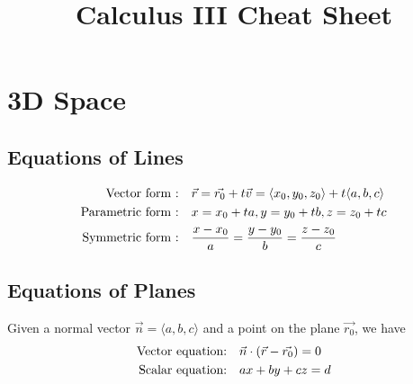 \documentclass[12pt]{article}
\title{Calculus III Cheat Sheet}
\date{}
\author{}
\theoremstyle{definition}
\begin{document}
\maketitle

\section{3D Space}

\subsection{Equations of Lines}
\begin{align*}
	\text{Vector form     :\hspace{1em}} & \vec{r} = \vec{r_0} + t\vec{v}= \left\langle x_0, y_0, z_0 \right\rangle + t \langle a, b, c \rangle \\
	\text{Parametric form :\hspace{1em}} & x = x_0 + ta, y = y_0 + tb, z = z_0 + tc                                                             \\
	\text{Symmetric form  :\hspace{1em}} & \frac{x - x_0}{a} = \frac{y - y_0}{b} = \frac{z - z_0}{c}
\end{align*}

\subsection{Equations of Planes}
Given a normal vector $\vec{n} = \langle a, b, c \rangle$ and a point on the plane $\vec{r_0}$, we have \begin{align*}
	\text{Vector equation:\hspace{1em}} & \vec{n} \cdot \left( \vec{r} - \vec{r_0} \right) = 0 \\
	\text{Scalar equation:\hspace{1em}} & ax + by + cz = d
\end{align*}
\end{document}
